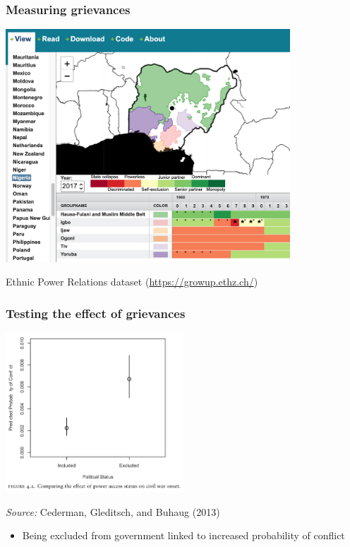 \documentclass[aspectratio=43]{beamer}
\begin{document}
\begin{frame}
\frametitle{Measuring grievances}
\centering

\includegraphics[width = 0.8\textwidth]{img/epr_nigeria}

\vspace{10pt}

{\small Ethnic Power Relations dataset (\url{https://growup.ethz.ch/})}

\end{frame}

\begin{frame}
\frametitle{Testing the effect of grievances}
\centering

\includegraphics[width = 0.5\textwidth]{img/cgb_effect_exclusion}

\vspace{10pt}

{\small \textit{Source:} Cederman, Gleditsch, and Buhaug (2013)}

\vspace{15pt}

\begin{itemize}
  \item Being excluded from government linked to increased probability of conflict
\end{itemize}

\end{frame}
\end{document}
